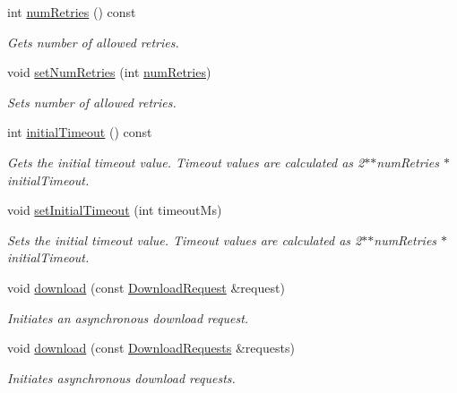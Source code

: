 \begin{DoxyCompactItemize}
int \hyperlink{classdg_1_1deepcore_1_1network_1_1_http_downloader_a30ec3373b55c7ddaff1e8b57cabec743}{num\+Retries} () const 
\begin{DoxyCompactList}\small\item\em Gets number of allowed retries. \end{DoxyCompactList}\item 
void \hyperlink{classdg_1_1deepcore_1_1network_1_1_http_downloader_a3a99ef6075397d7f9ab96b4ead57de4c}{set\+Num\+Retries} (int \hyperlink{classdg_1_1deepcore_1_1network_1_1_http_downloader_a30ec3373b55c7ddaff1e8b57cabec743}{num\+Retries})
\begin{DoxyCompactList}\small\item\em Sets number of allowed retries. \end{DoxyCompactList}\item 
int \hyperlink{classdg_1_1deepcore_1_1network_1_1_http_downloader_a5e2bc1da2630a48e9fa9eb005a7b6d31}{initial\+Timeout} () const 
\begin{DoxyCompactList}\small\item\em Gets the initial timeout value. Timeout values are calculated as 2$\ast$$\ast$num\+Retries $\ast$ initial\+Timeout. \end{DoxyCompactList}\item 
void \hyperlink{classdg_1_1deepcore_1_1network_1_1_http_downloader_accc3b3a692b3b2581e9ea18d9ddf7d2f}{set\+Initial\+Timeout} (int timeout\+Ms)
\begin{DoxyCompactList}\small\item\em Sets the initial timeout value. Timeout values are calculated as 2$\ast$$\ast$num\+Retries $\ast$ initial\+Timeout. \end{DoxyCompactList}\item 
void \hyperlink{classdg_1_1deepcore_1_1network_1_1_http_downloader_a13b218a870bed20fbf52ee04724534ac}{download} (const \hyperlink{structdg_1_1deepcore_1_1network_1_1_download_request}{Download\+Request} \&request)
\begin{DoxyCompactList}\small\item\em Initiates an asynchronous download request. \end{DoxyCompactList}\item 
void \hyperlink{classdg_1_1deepcore_1_1network_1_1_http_downloader_ace4019b99cd1e7dfcc2ca51b3cbcffd4}{download} (const \hyperlink{group___network_module_ga6a460317d5e2b04bbaa2bb5389ca2ce3}{Download\+Requests} \&requests)
\begin{DoxyCompactList}\small\item\em Initiates asynchronous download requests. \end{DoxyCompactList}\end{DoxyCompactItemize}
